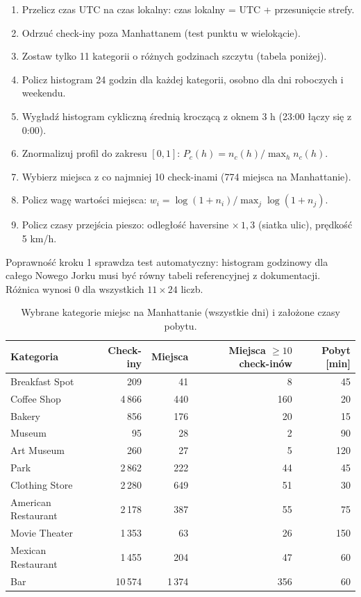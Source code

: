 \documentclass[11pt,a4paper]{article}
\begin{document}
\begin{enumerate}
  \item Przelicz czas UTC na czas lokalny: czas lokalny = UTC + przesunięcie strefy.
  \item Odrzuć check-iny poza Manhattanem (test punktu w wielokącie).
  \item Zostaw tylko 11 kategorii o różnych godzinach szczytu (tabela poniżej).
  \item Policz histogram 24 godzin dla każdej kategorii, osobno dla dni roboczych i weekendu.
  \item Wygładź histogram cykliczną średnią kroczącą z oknem 3 h (23:00 łączy się z 0:00).
  \item Znormalizuj profil do zakresu $[0,1]$: $P_c(h) = n_c(h) / \max_h n_c(h)$.
  \item Wybierz miejsca z co najmniej 10 check-inami (774 miejsca na Manhattanie).
  \item Policz wagę wartości miejsca: $w_i = \log(1+n_i) / \max_j \log(1+n_j)$.
  \item Policz czasy przejścia pieszo: odległość haversine $\times\,1{,}3$ (siatka ulic), prędkość 5 km/h.
\end{enumerate}

Poprawność kroku 1 sprawdza test automatyczny: histogram godzinowy dla całego Nowego Jorku musi być równy tabeli referencyjnej z dokumentacji. Różnica wynosi 0 dla wszystkich $11 \times 24$ liczb.

\begin{table}[h]
\centering
\caption{Wybrane kategorie miejsc na Manhattanie (wszystkie dni) i założone czasy pobytu.}
\begin{tabular}{lrrrr}
\toprule
Kategoria & Check-iny & Miejsca & Miejsca $\geq 10$ check-inów & Pobyt [min] \\
\midrule
Breakfast Spot & 209 & 41 & 8 & 45 \\
Coffee Shop & 4\,866 & 440 & 160 & 20 \\
Bakery & 856 & 176 & 20 & 15 \\
Museum & 95 & 28 & 2 & 90 \\
Art Museum & 260 & 27 & 5 & 120 \\
Park & 2\,862 & 222 & 44 & 45 \\
Clothing Store & 2\,280 & 649 & 51 & 30 \\
American Restaurant & 2\,178 & 387 & 55 & 75 \\
Movie Theater & 1\,353 & 63 & 26 & 150 \\
Mexican Restaurant & 1\,455 & 204 & 47 & 60 \\
Bar & 10\,574 & 1\,374 & 356 & 60 \\
\bottomrule
\end{tabular}
\end{table}
\end{document}
